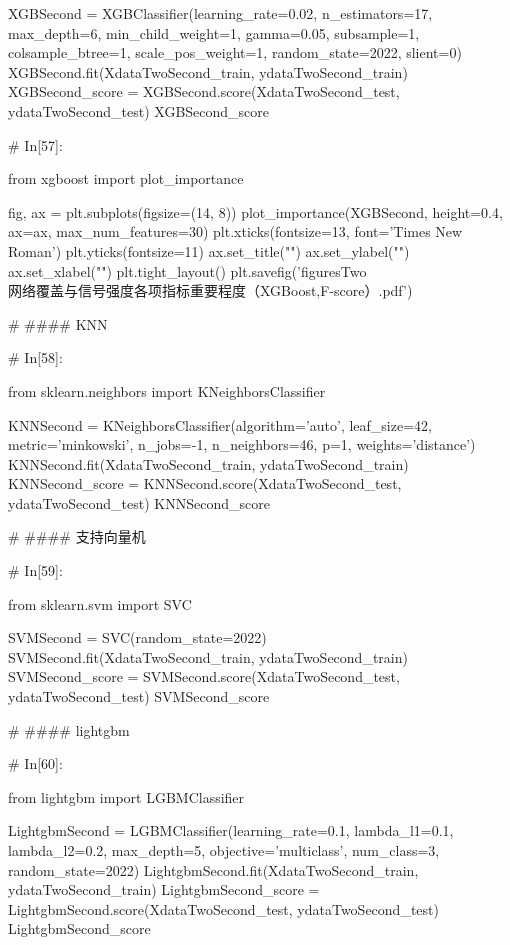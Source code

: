 \documentclass{MathorCupmodeling}
\begin{document}
\begin{python}
	XGBSecond = XGBClassifier(learning_rate=0.02,
							  n_estimators=17,
							  max_depth=6,
							  min_child_weight=1,
							  gamma=0.05,
							  subsample=1,
							  colsample_btree=1,
							  scale_pos_weight=1,
							  random_state=2022,
							  slient=0)
	XGBSecond.fit(XdataTwoSecond_train, ydataTwoSecond_train)
	XGBSecond_score = XGBSecond.score(XdataTwoSecond_test, ydataTwoSecond_test)
	XGBSecond_score
	
	# In[57]:
	
	
	from xgboost import plot_importance
	
	fig, ax = plt.subplots(figsize=(14, 8))
	plot_importance(XGBSecond, height=0.4, ax=ax, max_num_features=30)
	plt.xticks(fontsize=13, font='Times New Roman')
	plt.yticks(fontsize=11)
	ax.set_title("")
	ax.set_ylabel("")
	ax.set_xlabel("")
	plt.tight_layout()
	plt.savefig('figuresTwo\\[附件2]网络覆盖与信号强度各项指标重要程度（XGBoost,F-score）.pdf')
	
	# #### KNN
	
	# In[58]:
	
	
	from sklearn.neighbors import KNeighborsClassifier
	
	KNNSecond = KNeighborsClassifier(algorithm='auto', leaf_size=42,
									 metric='minkowski',
									 n_jobs=-1,
									 n_neighbors=46, p=1,
									 weights='distance')
	KNNSecond.fit(XdataTwoSecond_train, ydataTwoSecond_train)
	KNNSecond_score = KNNSecond.score(XdataTwoSecond_test, ydataTwoSecond_test)
	KNNSecond_score
	
	# #### 支持向量机
	
	# In[59]:
	
	
	from sklearn.svm import SVC
	
	SVMSecond = SVC(random_state=2022)
	SVMSecond.fit(XdataTwoSecond_train, ydataTwoSecond_train)
	SVMSecond_score = SVMSecond.score(XdataTwoSecond_test, ydataTwoSecond_test)
	SVMSecond_score
	
	# #### lightgbm
	
	# In[60]:
	
	
	from lightgbm import LGBMClassifier
	
	LightgbmSecond = LGBMClassifier(learning_rate=0.1,
									lambda_l1=0.1,
									lambda_l2=0.2,
									max_depth=5,
									objective='multiclass',
									num_class=3,
									random_state=2022)
	LightgbmSecond.fit(XdataTwoSecond_train, ydataTwoSecond_train)
	LightgbmSecond_score = LightgbmSecond.score(XdataTwoSecond_test, ydataTwoSecond_test)
	LightgbmSecond_score
	

\end{python}
\end{document}
